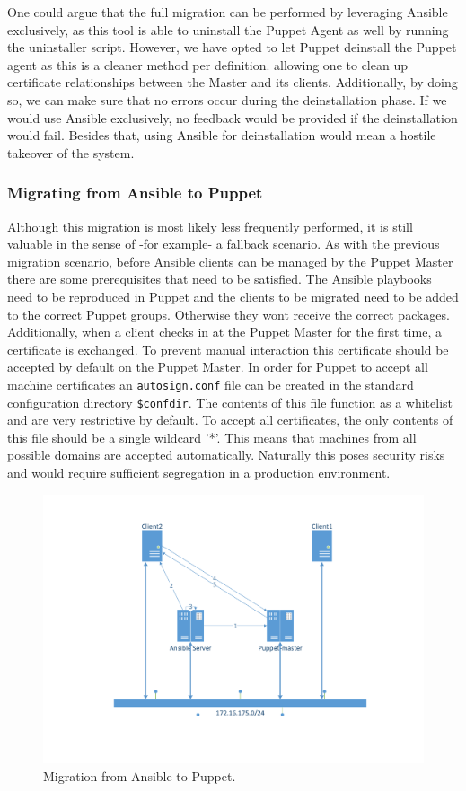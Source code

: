 \noindent
One could argue that the full migration can be performed by leveraging Ansible exclusively, as this tool is able to uninstall the Puppet Agent as well by running the uninstaller script. However, we have opted to let Puppet deinstall the Puppet agent as this is a cleaner method per definition. allowing one to clean up certificate relationships between the Master and its clients. Additionally, by doing so, we can make sure that no errors occur during the deinstallation phase. If we would use Ansible exclusively, no feedback would be provided if the deinstallation would fail. Besides that, using Ansible for deinstallation would mean a hostile takeover of the system. 

\subsubsection{Migrating from Ansible to Puppet}\label{subsec:ansibletoPuppet}
Although this migration is most likely less frequently performed, it is still valuable in the sense of -for example- a fallback scenario. As with the previous migration scenario, before Ansible clients can be managed by the Puppet Master there are some prerequisites that need to be satisfied. The Ansible playbooks need to be reproduced in Puppet and the clients to be migrated need to be added to the correct Puppet groups. Otherwise they wont receive the correct packages. Additionally, when a client checks in at the Puppet Master for the first time, a certificate is exchanged. To prevent manual interaction this certificate should be accepted by default on the Puppet Master. In order for Puppet to accept all machine certificates an \texttt{autosign.conf} file can be created in the standard configuration directory \texttt{\$confdir}. The contents of this file function as a whitelist and are very restrictive by default. To accept all certificates, the only contents of this file should be a single wildcard '*'. This means that machines from all possible domains are accepted automatically. Naturally this poses security risks and would require sufficient segregation in a production environment.

\begin{figure}[!h]
        \includegraphics[scale=0.5]{img/AnsibletoPuppet.pdf}
        \caption{Migration from Ansible to Puppet.}
        \label{fig:situation2}
\end{figure}

